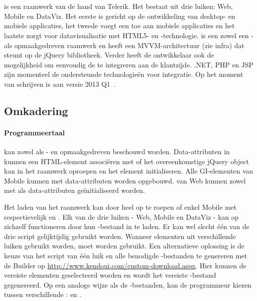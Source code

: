 
\section{\kendo}
\label{sec:raamwerk-kendo}
\kendo{} is een raamwerk van de hand van Telerik.
Het bestaat uit drie luiken:  Web, Mobile en DataViz.  
Het eerste is gericht op de ontwikkeling van desktop- en mobiele applicaties,  het tweede voegt een  toe aan mobiele applicaties en het laatste zorgt voor datavisualisatie met HTML5- en \js{}-technologie.
\kendo{} is een zowel een \js{}- als opmaakgedreven raamwerk en heeft een MVVM-architectuur (zie infra) dat steunt op de jQuery bibliotheek.
Verder heeft de ontwikkelaar ook de mogelijkheid om eenvoudig de  te integreren aan de klantzijde.
.NET,  PHP en JSP zijn momenteel de ondersteunde technologieën voor  integratie.
Op het moment van schrijven is \kendo{} aan versie 2013 Q1~\cite{Telerik}. 

\subsection{Omkadering}
\label{sec:kendo-omkadering}

\paragraph{Programmeertaal}
\kendo{} kan zowel als \js{}- en opmaakgedreven beschouwd worden. 
Data-attributen in kunnen een HTML-element associëren met \kendo{} of het overeenkomstige jQuery object kan in \js{} het raamwerk oproepen en het element initialiseren.
Alle GI-elementen van \kendo{} Mobile kunnen met data-attributen worden opgebouwd.
 van \kendo{} Web kunnen zowel met \js{} als data-attributen geïnitialiseerd worden.

Het laden van het raamwerk kan door heel \kendo{} op te roepen of enkel \kendo{} Mobile met respectievelijk  en .
Elk van de drie luiken - Web, Mobile en DataViz - kan op zichzelf functioneren door hun \js{}-bestand in te laden.
Er kan wel slecht één van de drie script gelijktijdig gebruikt worden.  
Wanneer elementen uit verschillende luiken gebruikt worden, moet  worden gebruikt.
Een alternatieve oplossing is de keuze van het script van één luik en alle benodigde \js{}-bestanden te genereren met de \js{} Builder op \url{http://www.kendoui.com/custom-download.aspx}.
Hier kunnen de vereiste elementen geselecteerd worden en wordt het vereiste \js{}-bestand gegenereerd.
Op een analoge wijze als de \js{}-bestanden, kan de programmeur kiezen tussen verschillende :   en .

